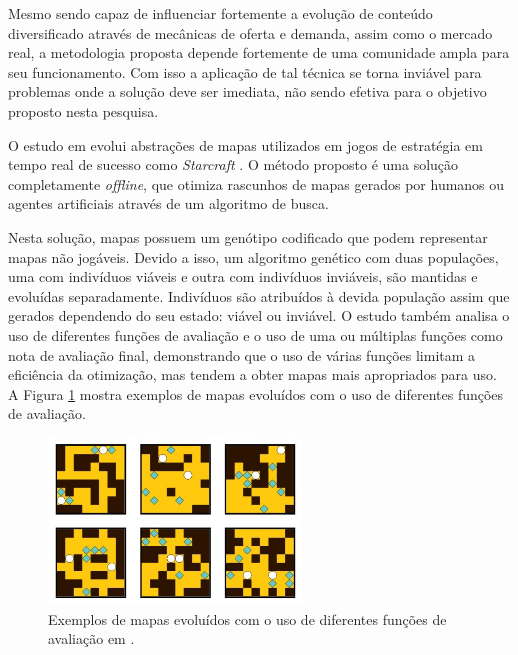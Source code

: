 Mesmo sendo capaz de influenciar fortemente a evolução de conteúdo diversificado através de mecânicas de oferta e demanda, assim como o mercado real, a metodologia proposta depende fortemente de uma comunidade ampla para seu funcionamento. Com isso a aplicação de tal técnica se torna inviável para problemas onde a solução deve ser imediata, não sendo efetiva para o objetivo proposto nesta pesquisa.

O estudo em \cite{liapis2013generating} evolui abstrações de mapas utilizados em jogos de estratégia em tempo real de sucesso como \emph{Starcraft} \cite{game:starcraft}. O método proposto é uma solução completamente \emph{offline}, que otimiza rascunhos de mapas gerados por humanos ou agentes artificiais através de um algoritmo de busca.

Nesta solução, mapas possuem um genótipo codificado que podem representar mapas não jogáveis. Devido a isso, um algoritmo genético com duas populações, uma com indivíduos viáveis e outra com indivíduos inviáveis, são mantidas e evoluídas separadamente. Indivíduos são atribuídos à devida população assim que gerados dependendo do seu estado: viável ou inviável. O estudo também analisa o uso de diferentes funções de avaliação e o uso de uma ou múltiplas funções como nota de avaliação final, demonstrando que o uso de várias funções limitam a eficiência da otimização, mas tendem a obter mapas mais apropriados para uso. A Figura \ref{fig:liapis2013generating} mostra exemplos de mapas evoluídos com o uso de diferentes funções de avaliação.

\begin{figure}[htb]
	\begin{center}
		\includegraphics[width=0.6\textwidth]{Imagens/liapis2013generating.jpg}
		\caption{Exemplos de mapas evoluídos com o uso de diferentes funções de avaliação em \cite{liapis2013generating}.}
		\label{fig:liapis2013generating}
	\end{center}
\end{figure}

